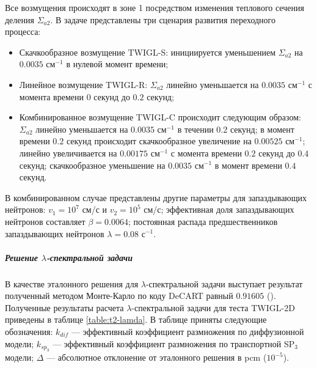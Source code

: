 \documentclass{crm-article}
\begin{document}
Все возмущения происходят в зоне 1 посредством изменения теплового сечения деления $\Sigma_{a2}$.
В задаче представлены три сценария развития переходного процесса:
\begin{itemize}\itemsep1pt \parskip0pt 
\item Скачкообразное возмущение TWIGL-S: инициируется уменьшением $\Sigma_{a2}$ на $0.0035$ см$^{-1}$ в нулевой момент времени;
\item Линейное возмущение TWIGL-R: $\Sigma_{a2}$ линейно уменьшается на $0.0035$ см$^{-1}$ с момента времени $0$ секунд до $0.2$ секунд;
\item Комбинированное возмущение TWIGL-C происходит следующим образом:
$\Sigma_{a2}$ линейно уменьшается на $0.0035$ см$^{-1}$ в течении $0.2$ секунд; в момент времени $0.2$ секунд происходит скачкообразное увеличение на $0.00525$ см$^{-1}$; линейно увеличивается на $0.00175$ см$^{-1}$  с момента времени $0.2$ секунд до $0.4$ секунд;  скачкообразное уменьшение на $0.0035$ см$^{-1}$ в момент времени $0.4$ секунд.
\end{itemize}
 
В комбинированном случае представлены другие параметры для запаздывающих нейтронов: $v_1 = 10^7$ см/с и $v_2 = 10^5$ см/с; эффективная доля запаздывающих нейтронов составляет $\beta = 0.0064$;  постоянная распада предшественников запаздывающих нейтронов $\lambda = 0.08$ с$^{-1}$. 

\subparagraph{Решение $\lambda$-спектральной задачи}
В качестве эталонного решения для $\lambda$-спектральной задачи выступает результат полученный методом Монте-Карло по коду DeCART равный $0.91605$ (\cite{joo2004}).
Полученные результаты расчета $\lambda$-спектральной задачи для теста TWIGL-2D приведены в таблице \ref{table:t2-lamda}.
В таблице приняты следующие обозначения: 
$k_{dif}$ --- эффективный коэффициент размножения по диффузионной модели; 
$k_{sp_3}$ --- эффективный коэффициент размножения по транспортной SP$_3$ модели;
$\Delta$ --- абсолютное отклонение от эталонного решения в pcm ($10^{-5}$).
\end{document}
